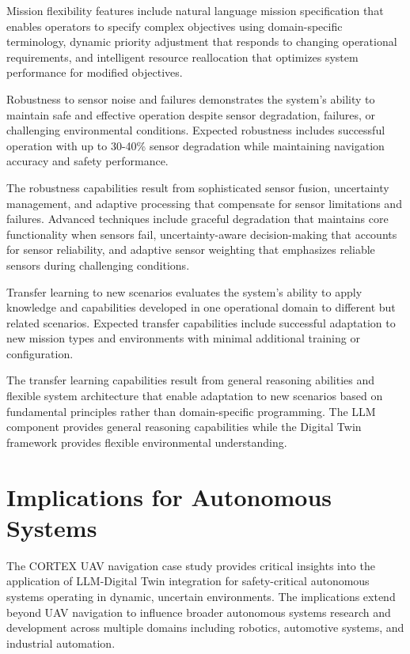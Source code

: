 Mission flexibility features include natural language mission specification that enables operators to specify complex objectives using domain-specific terminology, dynamic priority adjustment that responds to changing operational requirements, and intelligent resource reallocation that optimizes system performance for modified objectives.

Robustness to sensor noise and failures demonstrates the system's ability to maintain safe and effective operation despite sensor degradation, failures, or challenging environmental conditions. Expected robustness includes successful operation with up to 30-40\% sensor degradation while maintaining navigation accuracy and safety performance.

The robustness capabilities result from sophisticated sensor fusion, uncertainty management, and adaptive processing that compensate for sensor limitations and failures. Advanced techniques include graceful degradation that maintains core functionality when sensors fail, uncertainty-aware decision-making that accounts for sensor reliability, and adaptive sensor weighting that emphasizes reliable sensors during challenging conditions.

Transfer learning to new scenarios evaluates the system's ability to apply knowledge and capabilities developed in one operational domain to different but related scenarios. Expected transfer capabilities include successful adaptation to new mission types and environments with minimal additional training or configuration.

The transfer learning capabilities result from general reasoning abilities and flexible system architecture that enable adaptation to new scenarios based on fundamental principles rather than domain-specific programming. The LLM component provides general reasoning capabilities while the Digital Twin framework provides flexible environmental understanding.

\section{Implications for Autonomous Systems}

The CORTEX UAV navigation case study provides critical insights into the application of LLM-Digital Twin integration for safety-critical autonomous systems operating in dynamic, uncertain environments. The implications extend beyond UAV navigation to influence broader autonomous systems research and development across multiple domains including robotics, automotive systems, and industrial automation.

